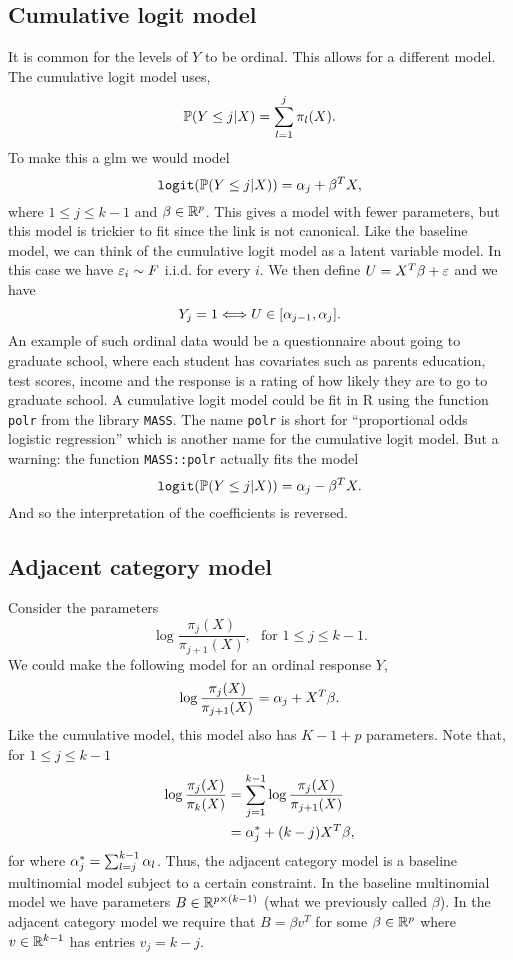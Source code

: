 \subsection{Cumulative logit model}
It is common for the levels of $Y$ to be ordinal. This allows for a different model. The cumulative logit model uses,
\[{\mathbb{P}}(Y \le j |X) = \sum_{l=1}^j \pi_l(X). \]
To make this a glm we would model 
\[\texttt{logit}({\mathbb{P}}(Y \le j |X)) = {\alpha}_j + \beta^TX, \]
where $1 \le j \le k-1$ and $\beta \in {\mathbb R}^p$. This gives a model with fewer parameters, but this model is trickier to fit since the link is not canonical. Like the baseline model, we can think of the cumulative logit model as a latent variable model. In this case we have $\varepsilon_i \sim F$ i.i.d. for every $i$. We then define $U= X^T\beta + \varepsilon$ and we have 
\[Y_j = 1 \Longleftrightarrow U \in [{\alpha}_{j-1},{\alpha}_j]. \]
An example of such ordinal data would be a questionnaire about going to graduate school, where each student has covariates such as parents education, test scores, income and the response is a rating of how likely they are to go to graduate school. A cumulative logit model could be fit in R using the function \texttt{polr} from the library \texttt{MASS}. The name \texttt{polr} is short for ``proportional odds logistic regression'' which is another name for the cumulative logit model. But a warning: the function \texttt{MASS::polr} actually fits the model
\[\texttt{logit}({\mathbb{P}}(Y \le j |X)) = {\alpha}_j - \beta^TX. \]
And so the interpretation of the coefficients is reversed.
\subsection{Adjacent category model}
Consider the parameters
\[\log \frac{\pi_j(X)}{\pi_{j+1}(X)},~~~\text{for } 1 \le j \le k-1. \]
We could make the following model for an ordinal response $Y$,
\[\log \frac{\pi_j(X)}{\pi_{j+1}(X)} = {\alpha}_j + X^T\beta.\]
Like the cumulative model, this model also has $K-1+p$ parameters. Note that, for $1 \le j \le k-1$
\begin{align*}
    \log \frac{\pi_j(X)}{\pi_k(X)} &=\sum_{j=1}^{k-1} \log \frac{\pi_j(X)}{\pi_{j+1}(X)}\\
    &={\alpha}_j^* + (k-j)X^T\beta,
\end{align*}
for where ${\alpha}_j^* = \sum_{l=j}^{k-1}{\alpha}_l$. Thus, the adjacent category model is a baseline multinomial model subject to a certain constraint. In the baseline multinomial model we have parameters $B \in {\mathbb R}^{p \times (k-1)}$ (what we previously called $\beta$). In the adjacent category model we require that $B = \beta v^T$ for some $\beta \in {\mathbb R}^p$ where $v \in {\mathbb R}^{k-1}$ has entries $v_j = k-j$. 

